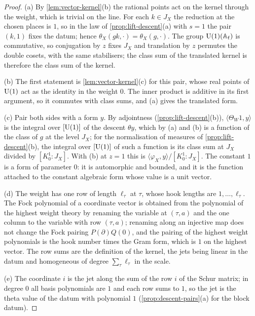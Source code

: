 \begin{proof}
(a) By \cref{lem:vector-kernel}(b) the rational points act on the kernel through the weight, which is trivial on the line. For each $k\in J_X$ the reduction at the chosen places is $1$, so in the law of \cref{prop:lift-descent}(a)
with $s=1$ the pair $(k,1)$ fixes the datum; hence $\theta_X(gk,\cdot)=\theta_X(g,\cdot)$. The group $\operatorname{U}(1)(\mathbb{A}_{\rm f})$ is commutative, so conjugation by $z$ fixes $J_X$ and translation by $z$ permutes the double cosets,
with the same stabilisers; the class sum of the translated kernel is therefore the class sum of the kernel.

(b) The first statement is \cref{lem:vector-kernel}(c) for this pair, whose real points of $\operatorname{U}(1)$ act as the identity in the weight $0$. The inner product is additive in its first argument, so it commutes with class sums, and (a)
gives the translated form.

(c) Pair both sides with a form $y$. By adjointness (\cref{prop:lift-descent}(b)), $\langle\Theta_W1,y\rangle$ is the integral over $[\operatorname{U}(1)]$ of the descent $\theta y$, which by (a) and (b) is a function of the class of $g$ at the level
$J_X$; for the normalisation of measures of \cref{prop:lift-descent}(b), the integral over $[\operatorname{U}(1)]$ of such a function is its class sum at $J_X$ divided by $[K_0^1:J_X]$. With (b) at $z=1$ this is $\langle\varphi_X,y\rangle/[K_0^1:J_X]$.
The constant $1$ is a form of parameter $0$: it is automorphic and bounded, and it is the function attached to the constant algebraic form whose value is a unit vector.

(d) The weight has one row of length $\ell_\tau$ at $\tau$, whose hook lengths are $1,\dots,\ell_\tau$. The Fock polynomial of a coordinate vector is obtained from the polynomial of the highest weight theory by renaming the variable at
$(\tau,a)$ and the one column to the variable with row $(\tau,a)$; renaming along an injective map does not change the Fock pairing $P(\partial)Q(0)$, and the pairing of the highest weight polynomials is the hook number times the
Gram form, which is $1$ on the highest vector. The row sums are the definition of the kernel, the jets being linear in the datum and homogeneous of degree $\sum_\tau\ell_\tau$ in the scale.

(e) The coordinate $i$ is the jet along the sum of the row $i$ of the Schur matrix; in degree $0$ all basis polynomials are $1$ and each row sums to $1$, so the jet is the theta value of the datum with polynomial $1$
(\cref{prop:descent-pairs}(a) for the block datum).
\end{proof}

